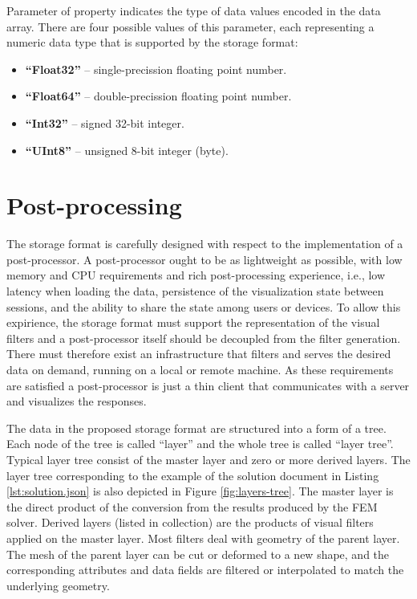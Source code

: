 Parameter  of  property indicates the type of data values encoded in the data array. There are four possible values of this parameter, each representing a numeric data type that is supported by the storage format:

\begin{itemize}
    \item \textbf{``Float32''} -- single-precission floating point number.
    \item \textbf{``Float64''} -- double-precission floating point number.
    \item \textbf{``Int32''} -- signed 32-bit integer.
    \item \textbf{``UInt8''} -- unsigned 8-bit integer (byte).
\end{itemize}

\section{Post-processing}
\label{sec:postprocessing}

The storage format is carefully designed with respect to the implementation of a post-processor. A post-processor ought to be as lightweight as possible, with low memory and CPU requirements and rich post-processing experience, i.e., low latency when loading the data, persistence of the visualization state between sessions, and the ability to share the state among users or devices. To allow this expirience, the storage format must support the representation of the visual filters and a post-processor itself should be decoupled from the filter generation. There must therefore exist an infrastructure that filters and serves the desired data on demand, running on a local or remote machine. As these requirements are satisfied a post-processor is just a thin client that communicates with a server and visualizes the responses.

The data in the proposed storage format are structured into a form of a tree. Each node of the tree is called ``layer'' and the whole tree is called ``layer tree''. Typical layer tree consist of the master layer and zero or more derived layers. The layer tree corresponding to the example of the solution document in Listing \ref{lst:solution.json} is also depicted in Figure \ref{fig:layers-tree}. The master layer is the direct product of the conversion from the results produced by the FEM solver. Derived layers (listed in  collection) are the products of visual filters applied on the master layer. Most filters deal with geometry of the parent layer. The mesh of the parent layer can be cut or deformed to a new shape, and the corresponding attributes and data fields are filtered or interpolated to match the underlying geometry.

